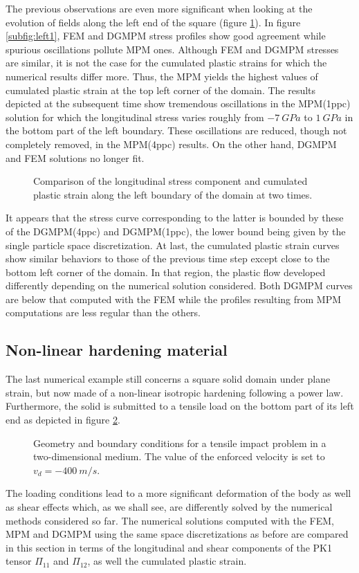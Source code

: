 The previous observations are even more significant when looking at the evolution of fields along the left end of the square (figure \ref{fig:left_line}).
In figure \ref{subfig:left1}, FEM and DGMPM stress profiles show good agreement while spurious oscillations pollute MPM ones. 
Although FEM and DGMPM stresses are similar, it is not the case for the cumulated plastic strains for which the numerical results differ more.
Thus, the MPM yields the highest values of cumulated plastic strain at the top left corner of the domain.
The results depicted at the subsequent time show tremendous oscillations in the MPM(1ppc) solution for which the longitudinal stress varies roughly from $-7 \: GPa$ to $1 \: GPa$ in the bottom part of the left boundary.
These oscillations are reduced, though not completely removed, in the MPM(4ppc) results. 
On the other hand, DGMPM and FEM solutions no longer fit.
\begin{figure}[ht]
  \centering
  {}
  {}
  
  \caption{Comparison of the longitudinal stress component and cumulated plastic strain along the left boundary of the domain at two times.}
  \label{fig:left_line}
\end{figure}
It appears that the stress curve corresponding to the latter is bounded by these of the DGMPM(4ppc) and DGMPM(1ppc), the lower bound being given by the single particle space discretization.
At last, the cumulated plastic strain curves show similar behaviors to those of the previous time step except close to the bottom left corner of the domain.
In that region, the plastic flow developed differently depending on the numerical solution considered.
Both DGMPM curves are below that computed with the FEM while the profiles resulting from MPM computations are less regular than the others.

\subsection{Non-linear hardening material}
\label{sec:non-linear-hardening}
The last numerical example still concerns a square solid domain under plane strain, but now made of a non-linear isotropic hardening following a power law.
Furthermore, the solid is submitted to a tensile load on the bottom part of its left end as depicted in figure \ref{fig:geom_partial_traction}.
\begin{figure}[ht]
  \centering
  
  \caption{Geometry and boundary conditions for a tensile impact problem in a two-dimensional medium. The value of the enforced velocity is set to $v_d=-400 \: m/s$.}
  \label{fig:geom_partial_traction}
\end{figure}
The loading conditions lead to a more significant deformation of the body as well as shear effects which, as we shall see, are differently solved by the numerical methods considered so far.
The numerical solutions computed with the FEM, MPM and DGMPM using the same space discretizations as before are compared in this section in terms of the longitudinal and shear components of the PK1 tensor $\Pi_{11}$ and $\Pi_{12}$, as well the cumulated plastic strain. 

